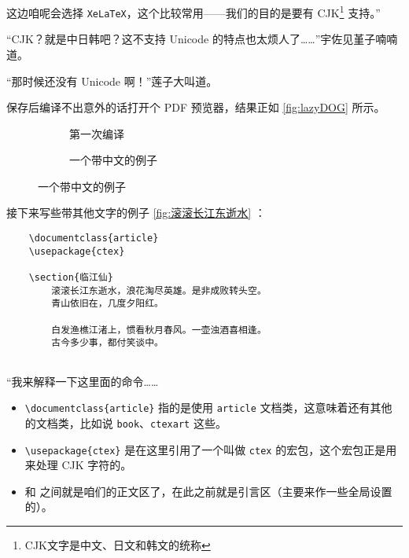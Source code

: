 这边咱呢会选择 \verb`XeLaTeX`，这个比较常用——我们的目的是要有 CJK\footnote{CJK文字是中文、日文和韩文的统称} 支持。”

“CJK？就是中日韩吧？这不支持 Unicode 的特点也太烦人了……”宇佐见堇子喃喃道。

“那时候还没有 Unicode 啊！”莲子大叫道。

保存后编译不出意外的话打开个 PDF 预览器，结果正如 \autoref{fig:lazyDOG} 所示。

\begin{figure}[t]
    \centering
    \begin{subfigure}[t]{0.4\textwidth} \centering
        \caption{第一次编译}
        \label{fig:lazyDOG}
    \end{subfigure}\quad
    \begin{subfigure}[t]{0.4\textwidth} \centering
        \caption{一个带中文的例子}
        \label{fig:滚滚长江东逝水}
    \end{subfigure}
\end{figure}

接下来写些带其他文字的例子 \autoref{fig:滚滚长江东逝水} ：


\begin{lstlisting}
    \documentclass{article}
    \usepackage{ctex}
    
    \section{临江仙}
        滚滚长江东逝水，浪花淘尽英雄。是非成败转头空。
        青山依旧在，几度夕阳红。

        白发渔樵江渚上，惯看秋月春风。一壶浊酒喜相逢。
        古今多少事，都付笑谈中。    
    
\end{lstlisting}


“我来解释一下这里面的命令……

\begin{itemize}
    \item \verb"\documentclass{article}" 指的是使用 \verb"article" 文档类，这意味着还有其他的文档类，比如说 \verb"book"、\verb"ctexart" 这些。
    \item \verb"\usepackage{ctex}" 是在这里引用了一个叫做 \verb"ctex" 的宏包，这个宏包正是用来处理 CJK 字符的。
    \item \verb"" 和 \verb"" 之间就是咱们的正文区了，在此之前就是引言区（主要来作一些全局设置的）。
\end{itemize}

